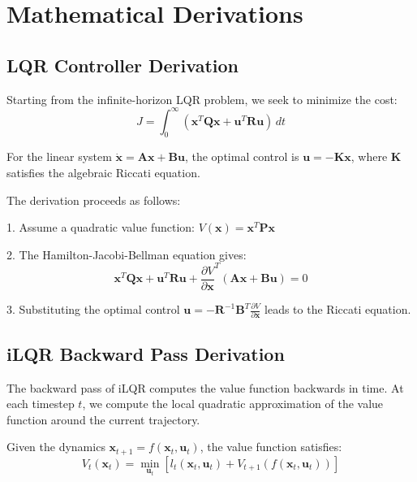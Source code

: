 \documentclass[conference]{IEEEtran}
\begin{document}
\section{Mathematical Derivations}

\subsection{LQR Controller Derivation}

Starting from the infinite-horizon LQR problem, we seek to minimize the cost:
\begin{equation}
J = \int_0^\infty (\mathbf{x}^T\mathbf{Q}\mathbf{x} + \mathbf{u}^T\mathbf{R}\mathbf{u})\,dt
\end{equation}

For the linear system $\dot{\mathbf{x}} = \mathbf{A}\mathbf{x} + \mathbf{B}\mathbf{u}$, the optimal control is $\mathbf{u} = -\mathbf{K}\mathbf{x}$, where $\mathbf{K}$ satisfies the algebraic Riccati equation.

The derivation proceeds as follows:

1. Assume a quadratic value function: $V(\mathbf{x}) = \mathbf{x}^T\mathbf{P}\mathbf{x}$

2. The Hamilton-Jacobi-Bellman equation gives:
\begin{equation}
\mathbf{x}^T\mathbf{Q}\mathbf{x} + \mathbf{u}^T\mathbf{R}\mathbf{u} + \frac{\partial V}{\partial \mathbf{x}}^T(\mathbf{A}\mathbf{x} + \mathbf{B}\mathbf{u}) = 0
\end{equation}

3. Substituting the optimal control $\mathbf{u} = -\mathbf{R}^{-1}\mathbf{B}^T\frac{\partial V}{\partial \mathbf{x}}$ leads to the Riccati equation.

\subsection{iLQR Backward Pass Derivation}

The backward pass of iLQR computes the value function backwards in time. At each timestep $t$, we compute the local quadratic approximation of the value function around the current trajectory.

Given the dynamics $\mathbf{x}_{t+1} = f(\mathbf{x}_t, \mathbf{u}_t)$, the value function satisfies:
\begin{equation}
V_t(\mathbf{x}_t) = \min_{\mathbf{u}_t} \left[ l_t(\mathbf{x}_t, \mathbf{u}_t) + V_{t+1}(f(\mathbf{x}_t, \mathbf{u}_t)) \right]
\end{equation}
\end{document}
